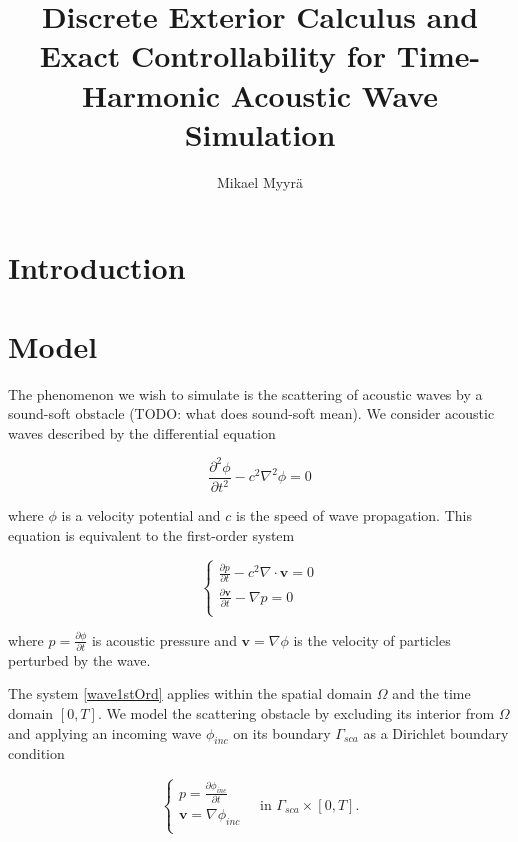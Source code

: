 \documentclass[utf8,english]{gradu3}
\title{Discrete Exterior Calculus and Exact Controllability for Time-Harmonic Acoustic Wave Simulation}
\author{Mikael Myyrä}
\begin{document}
\maketitle

\hfuzz=1.5pt
\mainmatter
\hfuzz=0pt


\chapter{Introduction}



\chapter{Model}

The phenomenon we wish to simulate is the scattering
of acoustic waves by a sound-soft obstacle (TODO: what does sound-soft mean).
We consider acoustic waves described by the differential equation

\begin{equation}
  \frac{\partial^2 \phi}{\partial t^2} - c^2 \nabla^2\phi = 0
\end{equation}

where $\phi$ is a velocity potential and $c$ is the speed of wave propagation.
This equation is equivalent to the first-order system

\begin{equation}\label{wave1stOrd}
  \begin{cases}
    \frac{\partial p}{\partial t} - c^2\nabla \cdot \mathbf{v} = 0 \\
    \frac{\partial \mathbf{v}}{\partial t} - \nabla p = 0 \\
  \end{cases}
\end{equation}

where $p = \frac{\partial \phi}{\partial t}$ is acoustic pressure
and $\mathbf{v} = \nabla \phi$ is the velocity
of particles perturbed by the wave.

The system \eqref{wave1stOrd} applies within the spatial domain $\Omega$
and the time domain $[0, T]$.
We model the scattering obstacle by excluding its interior from $\Omega$
and applying an incoming wave $\phi_{inc}$ on its boundary $\Gamma_{sca}$
as a Dirichlet boundary condition

\[
  \begin{cases}
    p = \frac{\partial \phi_{inc}}{\partial t} \\
    \mathbf{v} = \nabla \phi_{inc} \\
  \end{cases}
  \quad \text{in } \Gamma_{sca} \times [0, T].
\]
\end{document}
